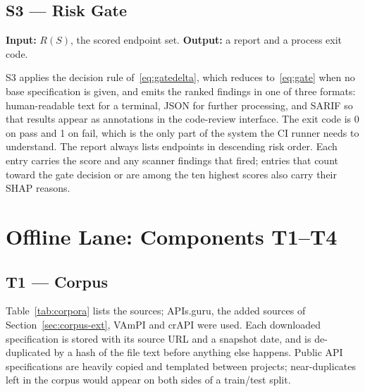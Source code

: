\documentclass[conference]{IEEEtran}
\begin{document}
\subsection{S3 --- Risk Gate}
\textbf{Input:} $R(S)$, the scored endpoint set. \textbf{Output:} a report and a process exit
code.

S3 applies the decision rule of~\eqref{eq:gatedelta}, which reduces to~\eqref{eq:gate} when no
base specification is given, and emits the ranked findings in one of three formats:
human-readable text for a terminal, JSON for further processing, and SARIF so that results
appear as annotations in the code-review interface. The exit code is 0 on pass and 1 on fail,
which is the only part of the system the CI runner needs to understand. The report always
lists endpoints in descending risk order. Each entry carries the score and any scanner
findings that fired; entries that count toward the gate decision or are among the ten highest
scores also carry their SHAP reasons.

\section{Offline Lane: Components T1--T4}

\subsection{T1 --- Corpus}
Table~\ref{tab:corpora} lists the sources; APIs.guru, the added sources of Section~\ref{sec:corpus-ext}, VAmPI and crAPI were used. Each downloaded specification is stored with
its source URL and a snapshot date, and is de-duplicated by a hash of the file text before
anything else happens. Public API specifications are heavily copied and templated between
projects; near-duplicates left in the corpus would appear on both sides of a train/test
split.
\end{document}

